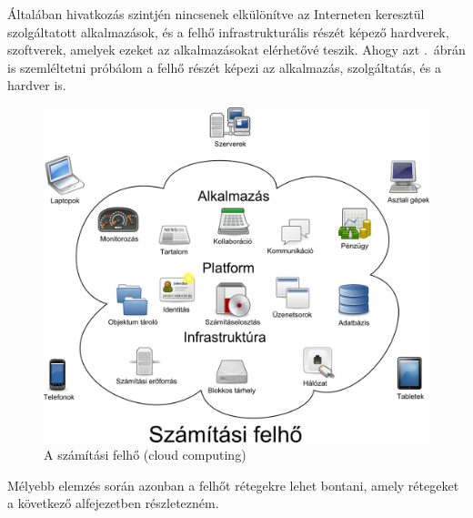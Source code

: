 Általában hivatkozás szintjén nincsenek elkülönítve az Interneten keresztül szolgáltatott alkalmazások, és a felhő infrastrukturális részét képező hardverek, szoftverek, amelyek ezeket az alkalmazásokat elérhetővé teszik. Ahogy azt .~ábrán is szemléltetni próbálom a felhő részét képezi az alkalmazás, szolgáltatás, és a hardver is.

\begin{figure}[h!]
\centering
\includegraphics[width=1.0\textwidth]{figures/Cloud_computing_hu.png}
\caption{A számítási felhő (\foreignlanguage{english}{cloud computing})} \label{fig:cloud_computing_hu}
\end{figure}





Mélyebb elemzés során azonban a felhőt rétegekre lehet bontani, amely rétegeket a következő alfejezetben részletezném.

